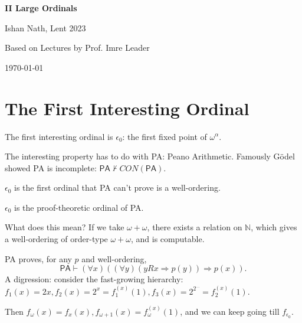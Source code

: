 \documentclass[12pt]{article}
\begin{document}
\hypersetup{pageanchor=false}
\begin{titlepage}
	\begin{center}
		\vspace*{1em}
		\Huge
		\textbf{II Large Ordinals}

		\vspace{1em}
		\large
		Ishan Nath, Lent 2023

		\vspace{1.5em}

		\Large

		Based on Lectures by Prof. Imre Leader

		\vspace{1em}

		\large
		\today
	\end{center}
	
\end{titlepage}
\hypersetup{pageanchor=true}

\tableofcontents

\newpage

\section{The First Interesting Ordinal}

The first interesting ordinal is $\epsilon_0$: the first fixed point of $\omega^{\alpha}$.

The interesting property has to do with PA: Peano Arithmetic. Famously G\"{o}del showed PA is incomplete: $\mathsf{PA} \not \vdash CON(\mathsf{PA})$.

$\epsilon_0$ is the first ordinal that PA can't prove is a well-ordering.
\begin{center}
	$\epsilon_0$ is the proof-theoretic ordinal of PA.
\end{center}

What does this mean? If we take $\omega + \omega$, there exists a relation on $\mathbb{N}$, which gives a well-ordering of order-type $\omega+\omega$, and is computable.

PA proves, for any $p$ and well-ordering,
\[
	\mathsf{PA} \vdash (\forall x)((\forall y)(y R x \Rightarrow p(y)) \Rightarrow p(x)).
\]
A digression: consider the fast-growing hierarchy: $f_1(x) = 2x, f_2(x) = 2^{x} = f_1^{(x)}(1), f_3(x) = 2^{2^{\cdots}} = f_2^{(x)}(1)$.

Then $f_{\omega}(x) = f_x(x), f_{\omega+1}(x) = f_{\omega}^{(x)}(1)$, and we can keep going till $f_{\epsilon_0}$.
\end{document}
